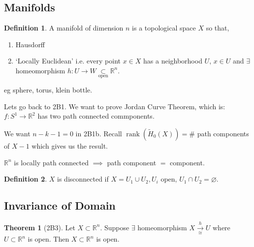 \documentclass{article}
\theoremstyle{definition}
\newtheorem*{definition}{Definition}
\newtheorem{theorem}{Theorem}
\begin{document}
    \subsection*{Manifolds}

    \begin{definition}
        A manifold of dimension \(n\) is a topological space \(X\) so that,

        \begin{enumerate}[label=\arabic*)]
            \item Hausdorff
            \item `Locally Euclidean' i.e. every point \(x\in X\) has a neighborhood \(U\), \(x\in U\) and \(\exists\) homeomorphism \(h: U \to W \underset{\text{open}}{\subset} \mathbb{R}^n\). 
        \end{enumerate} 
    \end{definition}

    eg sphere, torus, klein bottle.

    Lets go back to 2B1. We want to prove Jordan Curve Theorem, which is: \(f: S^1 \to \mathbb{R}^2\) has two path connected commponents.

    We want \(n-k-1=0\) in 2B1b. Recall \(\operatorname{rank} (\widetilde{H}_0(X)) = \#\) path components of \(X - 1\) which gives us the result.

    \(\mathbb{R}^n\) is locally path connected \(\implies\) path component \(=\) component.

    \begin{definition}
        \(X\) is disconnected if \(X = U_1 \cup U_2, U_i\) open, \(U_1\cap U_2=\varnothing\).
    \end{definition}

    \subsection*{Invariance of Domain}

    \begin{theorem}
        [2B3] Let \(X \subset \mathbb{R}^n\). Suppose \(\exists\) homeomorphism \(X \xrightarrow[\cong]{h} U\) where \(U \subset \mathbb{R}^n\) is open. Then \(X \subset \mathbb{R}^n\) is open. 
    \end{theorem}
\end{document}
